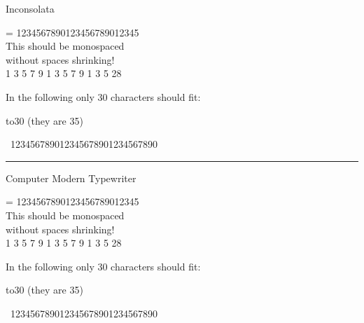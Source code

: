 \documentclass{article}
\begin{document}
\ttfamily
Inconsolata

\settowidth{\dimen0}{123456789012345678901234567}

\vbox{\hsize=
1234567890123456789012345\\
This should be monospaced\\
without spaces shrinking!\\
1 3 5 7 9 1 3 5 7 9 1 3 5 28
}

In the following only 30
characters should fit:

\settowidth{\dimen0}{A}

\leavevmode\hbox to30 (they are 35)

\hbox{%
123456789012345678901234567890}

% 
\bigskip \hrule \bigskip

\selectfont
Computer Modern Typewriter

\settowidth{\dimen0}{123456789012345678901234567}

\vbox{\hsize=
1234567890123456789012345\\
This should be monospaced\\
without spaces shrinking!\\
1 3 5 7 9 1 3 5 7 9 1 3 5 28
}

In the following only 30
characters should fit:

\settowidth{\dimen0}{A}

\leavevmode\hbox to30 (they are 35)

\hbox{%
123456789012345678901234567890}
\end{document}
